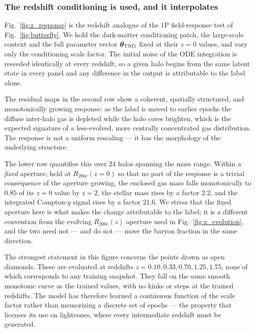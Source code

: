 \documentclass[linenumbers,trackchanges, twocolumn]{aastex701}
\begin{document}
\subsubsection{The redshift conditioning is used, and it interpolates}

Fig.~\ref{fig:z_response} is the redshift analogue of the 1P field-response test
of Fig.~\ref{fig:butterfly}. We hold the dark-matter conditioning patch, the
large-scale context and the full parameter vector $\bm{\theta}_{\rm TNG}$ fixed
at their $z=0$ values, and vary only the conditioning scale factor. The initial
noise of the ODE integration is reseeded identically at every redshift, so a
given halo begins from the same latent state in every panel and any difference in
the output is attributable to the label alone.

The residual maps in the second row show a coherent, spatially structured, and
monotonically growing response: as the label is moved to earlier epochs the
diffuse inter-halo gas is depleted while the halo cores brighten, which is the
expected signature of a less-evolved, more centrally concentrated gas
distribution. The response is not a uniform rescaling --- it has the morphology
of the underlying structure.

The lower row quantifies this over $24$ halos spanning the mass range. Within a
\emph{fixed} aperture, held at $R_{200c}(z=0)$ so that no part of the response is
a trivial consequence of the aperture growing, the enclosed gas mass falls
monotonically to $0.85$ of its $z=0$ value by $z=2$, the stellar mass rises by a
factor $2.2$, and the integrated Compton-$y$ signal rises by a factor $21.6$.
We stress that the fixed aperture here is what makes the change attributable to
the label; it is a different convention from the evolving $R_{200c}(z)$ aperture
used in Fig.~\ref{fig:z_evolution}, and the two need not --- and do not --- move
the baryon fraction in the same direction.

The strongest statement in this figure concerns the points drawn as open
diamonds. These are evaluated at redshifts $z = 0.10, 0.33, 0.70, 1.25, 1.75$,
none of which corresponds to any training snapshot. They fall on the same smooth
monotonic curve as the trained values, with no kinks or steps at the trained
redshifts. The model has therefore learned a continuous function of the scale
factor rather than memorizing a discrete set of epochs --- the property that
licenses its use on lightcones, where every intermediate redshift must be
generated.
\end{document}
